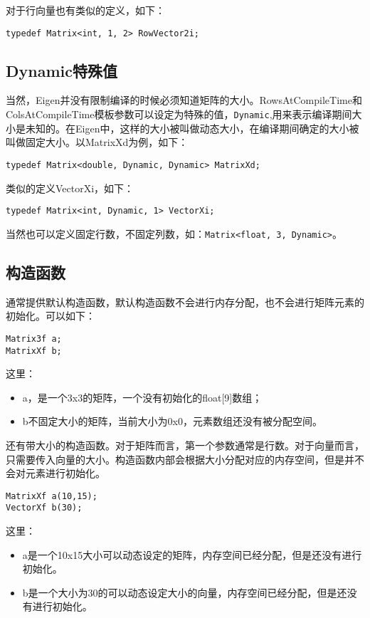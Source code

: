 对于行向量也有类似的定义，如下：

\verb|typedef Matrix<int, 1, 2> RowVector2i;|

\subsection{Dynamic特殊值}

当然，Eigen并没有限制编译的时候必须知道矩阵的大小。RowsAtCompileTime和ColsAtCompileTime模板参数可以设定为特殊的值，\verb|Dynamic|,用来表示编译期间大小是未知的。在Eigen中，这样的大小被叫做动态大小，在编译期间确定的大小被叫做固定大小。以MatrixXd为例，如下：

\verb|typedef Matrix<double, Dynamic, Dynamic> MatrixXd;|

类似的定义VectorXi，如下：

\verb|typedef Matrix<int, Dynamic, 1> VectorXi;|

当然也可以定义固定行数，不固定列数，如：\verb|Matrix<float, 3, Dynamic>|。

\subsection{构造函数}
通常提供默认构造函数，默认构造函数不会进行内存分配，也不会进行矩阵元素的初始化。可以如下：

\begin{lstlisting}[style=Cpp]
Matrix3f a;
MatrixXf b;
\end{lstlisting}

这里：
\begin{itemize}
\item a，是一个3x3的矩阵，一个没有初始化的float[9]数组；
\item b不固定大小的矩阵，当前大小为0x0，元素数组还没有被分配空间。
\end{itemize}

还有带大小的构造函数。对于矩阵而言，第一个参数通常是行数。对于向量而言，只需要传入向量的大小。构造函数内部会根据大小分配对应的内存空间，但是并不会对元素进行初始化。

\begin{lstlisting}[style=Cpp]
MatrixXf a(10,15);
VectorXf b(30);
\end{lstlisting}

这里：
\begin{itemize}
\item a是一个10x15大小可以动态设定的矩阵，内存空间已经分配，但是还没有进行初始化。
\item b是一个大小为30的可以动态设定大小的向量，内存空间已经分配，但是还没有进行初始化。
\end{itemize}

